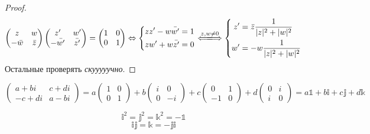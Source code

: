 \begin{proof}
$$\left(\begin{matrix}z & w \\ -\bar w & \bar z\end{matrix}\right)\left(\begin{matrix}z' & w' \\ -\bar{w'} & \bar{z'}\end{matrix}\right) = \left(\begin{matrix}1 & 0 \\ 0 & 1\end{matrix}\right) 
\Lra \left\{\begin{aligned}zz'-w\bar{w'} &= 1 \\ zw'+w\bar{z'} &= 0\end{aligned}\right.\xLongleftrightarrow{z, w \ne 0} \left\{\begin{aligned}z' &= \bar z\frac1{|z|^2+|w|^2} \\ w' &= -w\frac1{|z|^2+|w|^2}\end{aligned}\right.$$
Остальные проверять \textit{скууууучно}.
\end{proof}

$$\left(\begin{matrix}a + bi & c+di \\ -c+di & a-bi\end{matrix}\right) = a \left(\begin{matrix}1 & 0 \\ 0 & 1\end{matrix}\right) + b \left(\begin{matrix}i & 0 \\ 0 & -i\end{matrix}\right) + c\left(\begin{matrix}0 & 1 \\ -1 & 0\end{matrix}\right) + d\left(\begin{matrix}0 & i \\ i & 0\end{matrix}\right) = a\mathbb{1} + b\mathbb{i} + c\mathbb{j} + d\mathbb{k}$$

$$\mathbb{i}^2 = \mathbb{j}^2 = \mathbb{k}^2 = -\mathbb{1}$$
$$\mathbb{ij} = \mathbb{k} = -\mathbb{ji}$$